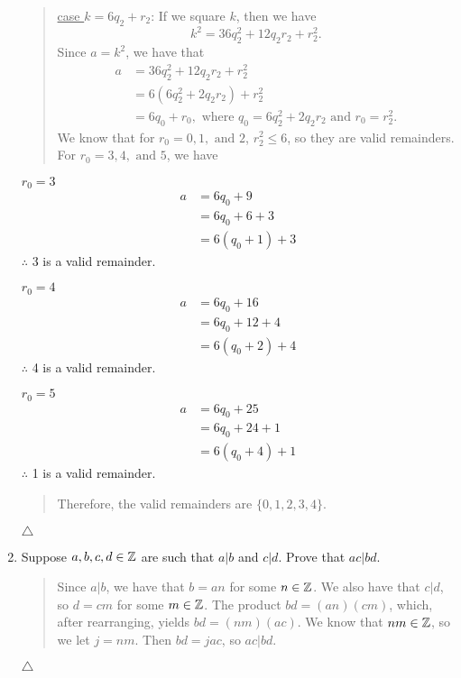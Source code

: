\documentclass{hw}
\begin{document}
\begin{enumerate}
\begin{quote}
\underline{case $k = 6q_{2} + r_{2}$}:
If we square $k$, then we have
\[
k^{2} = 36q_{2}^{2} + 12q_{2}r_{2} + r_{2}^{2}.
\]
Since $a = k^{2}$, we have that
\begin{align*}
a &= 36q_{2}^{2} + 12q_{2}r_{2} + r_{2}^{2}\\
&= 6(6q_{2}^{2} + 2q_{2}r_{2}) + r_{2}^{2}\\
&= 6q_{0} + r_{0},\text{ where } q_{0} = 6q_{2}^{2} + 2q_{2}r_{2} \text{ and } r_{0} = r_{2}^{2}.
\end{align*}
We know that for $r_{0} = 0,1,\text{ and }2$, $r_{2}^{2} \leq 6$, so they are valid remainders. For
$r_{0} = 3,4,\text{ and } 5$, we have
\end{quote}
\begin{minipage}{0.3\textwidth}
\underline{$r_{0} = 3$}
\begin{align*}
a &= 6q_{0} + 9\\
&= 6q_{0} + 6 + 3\\
&= 6(q_{0} + 1) + 3
\end{align*}
$\therefore$ 3 is a valid remainder.
\end{minipage}
\begin{minipage}{0.3\textwidth}
\underline{$r_{0} = 4$}
\begin{align*}
a &= 6q_{0} + 16\\
&= 6q_{0} + 12 + 4\\
&= 6(q_{0} + 2) + 4
\end{align*}
$\therefore$ 4 is a valid remainder.
\end{minipage}
\begin{minipage}{0.3\textwidth}
\underline{$r_{0} = 5$}
\begin{align*}
a &= 6q_{0} + 25\\
&= 6q_{0} + 24 + 1\\
&= 6(q_{0} + 4) + 1
\end{align*}
$\therefore$ 1 is a valid remainder.
\end{minipage}
\begin{quote}
Therefore, the valid remainders are $\{ 0, 1, 2, 3, 4\}$.
\end{quote}
$\triangle$

\item Suppose $a,b,c,d\in\mathbb{Z}$ are such that $a|b$ and $c|d$. Prove that $ac|bd$.
\begin{quote}
Since $a|b$, we have that $b = an$ for some $n\in\mathbb{Z}$. We also have that $c|d$, so $d=cm$ for some
$m\in\mathbb{Z}$. The product $bd = (an)(cm)$, which, after rearranging, yields $bd = (nm)(ac)$. We know that
$nm\in\mathbb{Z}$, so we let $j = nm$. Then $bd = jac$, so $ac|bd$.\\
\end{quote}
$\triangle$


\end{enumerate}
\end{document}
